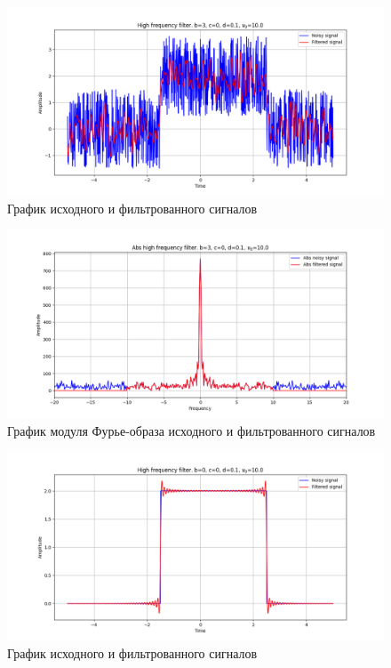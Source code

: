 \documentclass[a4paper, 16pt]{article}
\begin{document}
    \begin{figure}[!htb]
        \centering
        \includegraphics[scale=0.485]{5_u_flt_u_nohigh.png}
        \captionsetup{skip=0pt}
        \caption{График исходного и фильтрованного сигналов}
        \label{fig:fig7}
    \end{figure}
    \newpage
    \begin{figure}[!htb]
        \centering
        \includegraphics[scale=0.485]{5_abs_u_U_nohigh.png}
        \captionsetup{skip=0pt}
        \caption{График модуля Фурье-образа исходного и фильтрованного сигналов}
        \label{fig:fig8}
    \end{figure}
    \begin{figure}[!htb]
        \centering
        \includegraphics[scale=0.485]{4_u_flt_u_nohigh.png}
        \captionsetup{skip=0pt}
        \caption{График исходного и фильтрованного сигналов}
        \label{fig:fig9}
    \end{figure}
\end{document}
